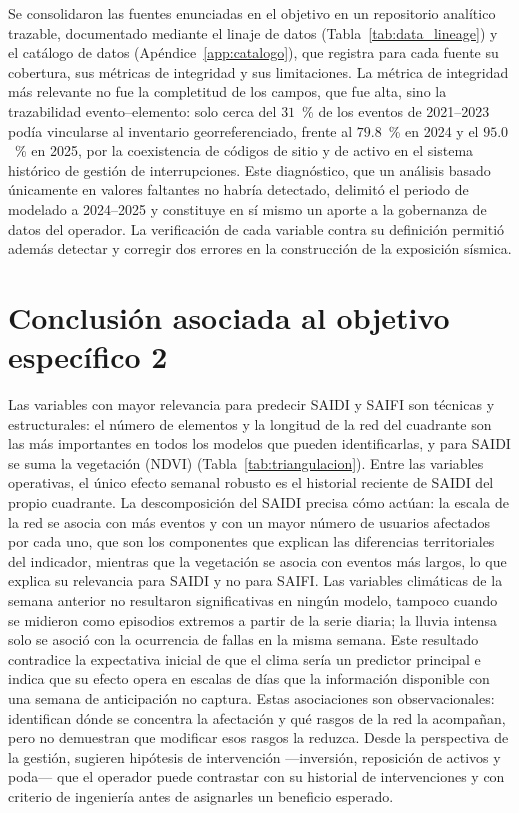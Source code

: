 Se consolidaron las fuentes enunciadas en el objetivo en un repositorio analítico trazable, documentado mediante el linaje de datos (Tabla~\ref{tab:data_lineage}) y el catálogo de datos (Apéndice~\ref{app:catalogo}), que registra para cada fuente su cobertura, sus métricas de integridad y sus limitaciones. La métrica de integridad más relevante no fue la completitud de los campos, que fue alta, sino la trazabilidad evento--elemento: solo cerca del $31$~\% de los eventos de 2021--2023 podía vincularse al inventario georreferenciado, frente al $79{.}8$~\% en 2024 y el $95{.}0$~\% en 2025, por la coexistencia de códigos de sitio y de activo en el sistema histórico de gestión de interrupciones. Este diagnóstico, que un análisis basado únicamente en valores faltantes no habría detectado, delimitó el periodo de modelado a 2024--2025 y constituye en sí mismo un aporte a la gobernanza de datos del operador. La verificación de cada variable contra su definición permitió además detectar y corregir dos errores en la construcción de la exposición sísmica.

\section{Conclusión asociada al objetivo específico 2}

Las variables con mayor relevancia para predecir SAIDI y SAIFI son técnicas y estructurales: el número de elementos y la longitud de la red del cuadrante son las más importantes en todos los modelos que pueden identificarlas, y para SAIDI se suma la vegetación (NDVI) (Tabla~\ref{tab:triangulacion}). Entre las variables operativas, el único efecto semanal robusto es el historial reciente de SAIDI del propio cuadrante. La descomposición del SAIDI precisa cómo actúan: la escala de la red se asocia con más eventos y con un mayor número de usuarios afectados por cada uno, que son los componentes que explican las diferencias territoriales del indicador, mientras que la vegetación se asocia con eventos más largos, lo que explica su relevancia para SAIDI y no para SAIFI. Las variables climáticas de la semana anterior no resultaron significativas en ningún modelo, tampoco cuando se midieron como episodios extremos a partir de la serie diaria; la lluvia intensa solo se asoció con la ocurrencia de fallas en la misma semana. Este resultado contradice la expectativa inicial de que el clima sería un predictor principal e indica que su efecto opera en escalas de días que la información disponible con una semana de anticipación no captura. Estas asociaciones son observacionales: identifican dónde se concentra la afectación y qué rasgos de la red la acompañan, pero no demuestran que modificar esos rasgos la reduzca. Desde la perspectiva de la gestión, sugieren hipótesis de intervención ---inversión, reposición de activos y poda--- que el operador puede contrastar con su historial de intervenciones y con criterio de ingeniería antes de asignarles un beneficio esperado.

